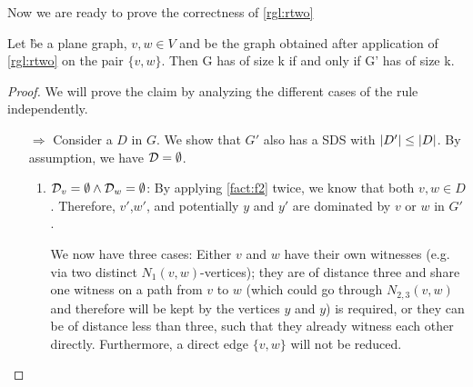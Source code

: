 
\noindent Now we are ready to prove the correctness of \cref{rgl:rtwo}
\begin{lemma}\label{lemma:correctnesstwo}
    Let \G be a plane graph, $v, w \in V$ and \GB be the graph obtained after application of \cref{rgl:rtwo} on the pair $\{v, w\}$. Then G has \sdom of size k if and only if G' has \sdom of size k.
\end{lemma}
\begin{proof}
    We will prove the claim by analyzing the different cases of the rule independently.     
    \begin{enumerate}
        \item[$\Rightarrow$] Consider a \sdom $D$ in $G$. We show that $G'$ also has a SDS with $\abs{D'} \leq \abs{D}$. By assumption, we have $\mathcal{D} = \emptyset$.
        \begin{enumerate}
            \item  $ \mathcal{D}_{v} = \emptyset  \wedge \mathcal{D}_{w} = \emptyset $: By applying \cref{fact:f2} twice, we know that both  $v, w \in D$. Therefore, $v'$,$w'$, and potentially $y$ and $y'$ are dominated by $v$ or $w$ in $G'$.
            
            We now have three cases: Either $v$ and $w$ have their own witnesses (e.g. via two distinct $N_1(v,w)$-vertices); they are of distance three and share one witness on a path from $v$ to $w$ (which could go through $N_{2,3}(v,w)$ and therefore will be kept by the vertices $y$ and $y$) is required, or they can be of distance less than three, such that they already witness each other directly. 
            Furthermore, a direct edge $\{v,w\}$ will not be reduced. 


\end{enumerate}
\end{enumerate}
\end{proof}
